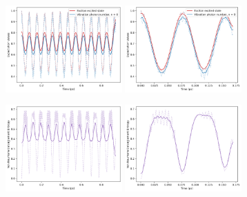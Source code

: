 \documentclass[11pt]{article}
\begin{document}
\newpage
\begin{figure}[H]
    \centering

    \begin{subfigure}{\textwidth}
        \centering
        \includegraphics[width=0.49\textwidth]{Research Project/Code/results/ExVib/Closed/Envelope/pops_excited.png}
        \hfill
        \includegraphics[width=0.49\textwidth]{Research Project/Code/results/ExVib/Closed/Fast/pops_excited.png}
        \caption{}
        \label{fig:EVM_CQS_Pop_e0}
    \end{subfigure}

    \vspace{0.8em}

    \begin{subfigure}{\textwidth}
        \centering
        \includegraphics[width=0.49\textwidth]{Research Project/Code/results/ExVib/Closed/Envelope/vne.png}
        \hfill
        \includegraphics[width=0.49\textwidth]{Research Project/Code/results/ExVib/Closed/Fast/vne.png}
        \caption{}
        \label{fig:EVM_CQS_Ent_e0}
    \end{subfigure}


\end{figure}
\end{document}
